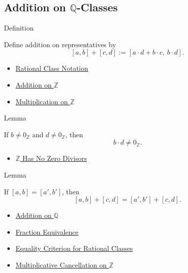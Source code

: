 \subsection*{Addition on $\mathbb{Q}$-Classes}

\begin{definitionbox}{Definition}
\begin{definition}
\label{def:addition-on-q-classes}
Define addition on representatives by
\[
[a,b]+[c,d]:=[a\cdot d+b\cdot c,\ b\cdot d].
\]
\end{definition}
\end{definitionbox}

\begin{dependencies}
\begin{itemize}
  \item \hyperref[def:rational-class-notation]{Rational Class Notation}
  \item \hyperref[def:addition-on-z-classes]{Addition on $\mathbb{Z}$}
  \item \hyperref[def:multiplication-on-z-classes]{Multiplication on $\mathbb{Z}$}
\end{itemize}
\end{dependencies}

\begin{lemmabox}{Lemma}
\begin{lemma}
\label{lem:addition-denominator-nonzero-q}
If $b\ne 0_{\mathbb{Z}}$ and $d\ne 0_{\mathbb{Z}}$, then
\[
b\cdot d\ne 0_{\mathbb{Z}}.
\]
\end{lemma}
\end{lemmabox}

\begin{dependencies}
\begin{itemize}
  \item \hyperref[thm:z-has-no-zero-divisors]{$\mathbb{Z}$ Has No Zero Divisors}
\end{itemize}
\end{dependencies}

\begin{lemmabox}{Lemma}
\begin{lemma}
\label{lem:addition-on-q-respects-left-equivalence}
If $[a,b]=[a',b']$, then
\[
[a,b]+[c,d]=[a',b']+[c,d].
\]
\end{lemma}
\end{lemmabox}

\begin{dependencies}
\begin{itemize}
  \item \hyperref[def:addition-on-q-classes]{Addition on $\mathbb{Q}$}
  \item \hyperref[def:fraction-equivalence]{Fraction Equivalence}
  \item \hyperref[prop:equality-criterion-for-rational-classes]{Equality Criterion for Rational Classes}
  \item \hyperref[cor:multiplicative-cancellation-on-z]{Multiplicative Cancellation on $\mathbb{Z}$}
\end{itemize}
\end{dependencies}

